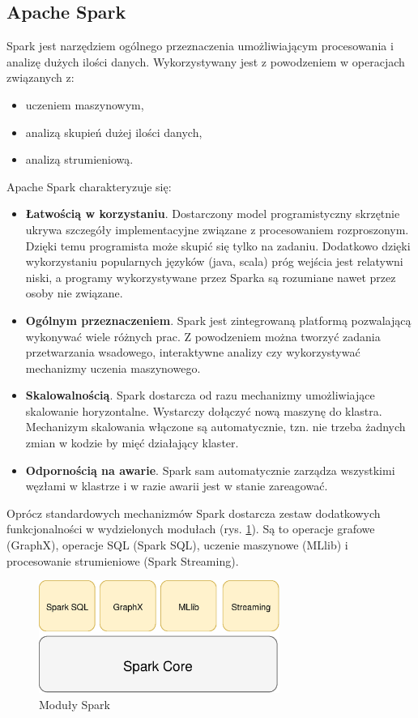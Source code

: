 \subsection{Apache Spark}
Spark jest narzędziem ogólnego przeznaczenia umożliwiającym procesowania
i analizę dużych ilości danych.
Wykorzystywany jest z powodzeniem w operacjach związanych z:
\begin{itemize}
  \item uczeniem maszynowym,
  \item analizą skupień dużej ilości danych,
  \item analizą strumieniową.
\end{itemize}
Apache Spark charakteryzuje się:
\begin{itemize}
  \item \textbf{Łatwością w korzystaniu}.
  Dostarczony model programistyczny skrzętnie ukrywa szczegóły implementacyjne związane z procesowaniem rozproszonym.
  Dzięki temu programista może skupić się tylko na zadaniu.
  Dodatkowo dzięki wykorzystaniu popularnych języków (java, scala) próg wejścia jest relatywni niski,
  a programy wykorzystywane przez Sparka są rozumiane nawet przez osoby nie związane.
  \item \textbf{Ogólnym przeznaczeniem}.
  Spark jest zintegrowaną platformą pozwalającą wykonywać wiele różnych prac.
  Z powodzeniem można tworzyć zadania przetwarzania wsadowego,
  interaktywne analizy czy wykorzystywać mechanizmy uczenia maszynowego.
  \item \textbf{Skalowalnością}.
  Spark dostarcza od razu mechanizmy umożliwiające skalowanie horyzontalne.
  Wystarczy dołączyć nową maszynę do klastra.
  Mechanizym skalowania włączone są automatycznie,
  tzn. nie trzeba żadnych zmian w kodzie by mięć działający klaster.
  \item \textbf{Odpornością na awarie}.
  Spark sam automatycznie zarządza wszystkimi węzłami w klastrze
  i w razie awarii jest w stanie zareagować.
\end{itemize}

Oprócz standardowych mechanizmów Spark dostarcza zestaw dodatkowych funkcjonalności
w wydzielonych modułach (rys. \ref{fig:SparkModules}).
Są to operacje grafowe (GraphX), operacje SQL (Spark SQL), uczenie maszynowe (MLlib)
i procesowanie strumieniowe (Spark Streaming).
\begin{figure}[htbp]
  \centering
  \includegraphics[width=0.7\textwidth]{img/sparkModules}
  \caption{Moduły Spark}
  \label{fig:SparkModules}
\end{figure}
